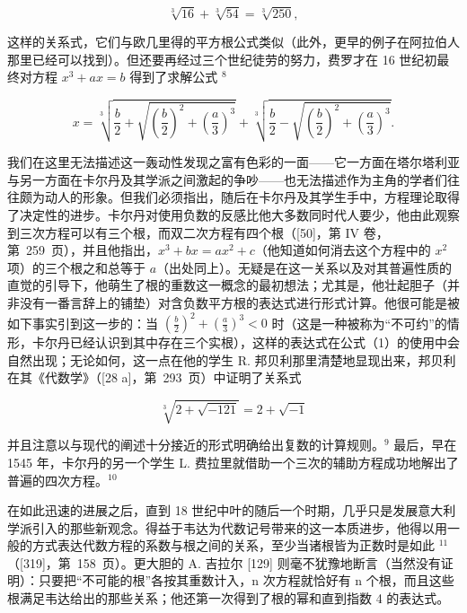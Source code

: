 \[
\sqrt [ 3 ]{16} + \sqrt [ 3 ]{54} = \sqrt [ 3 ]{250},
\]

这样的关系式，它们与欧几里得的平方根公式类似（此外，更早的例子在阿拉伯人那里已经可以找到）。但还要再经过三个世纪徒劳的努力，费罗才在 16 世纪初最终对方程 \(x^{3} + ax = b\) 得到了求解公式 \(^{8}\)

\[
x = \sqrt [ 3 ]{\frac {b}{2} + \sqrt {\left(\frac {b}{2}\right) ^ {2} + \left(\frac {a}{3}\right) ^ {3}}} + \sqrt [ 3 ]{\frac {b}{2} - \sqrt {\left(\frac {b}{2}\right) ^ {2} + \left(\frac {a}{3}\right) ^ {3}}}.\tag{5.1}
\]

我们在这里无法描述这一轰动性发现之富有色彩的一面——它一方面在塔尔塔利亚与另一方面在卡尔丹及其学派之间激起的争吵——也无法描述作为主角的学者们往往颇为动人的形象。但我们必须指出，随后在卡尔丹及其学生手中，方程理论取得了决定性的进步。卡尔丹对使用负数的反感比他大多数同时代人要少，他由此观察到三次方程可以有三个根，而双二次方程有四个根（{[}50{]}，第 IV 卷，第~259~页），并且他指出，\(x^3 + bx = ax^2 + c\)（他知道如何消去这个方程中的 \(x^2\) 项）的三个根之和总等于 \(a\)（出处同上）。无疑是在这一关系以及对其普遍性质的直觉的引导下，他萌生了根的重数这一概念的最初想法；尤其是，他壮起胆子（并非没有一番言辞上的铺垫）对含负数平方根的表达式进行形式计算。他很可能是被如下事实引到这一步的：当 \(\left(\frac{b}{2}\right)^{2}+\left(\frac{a}{3}\right)^{3}<0\) 时（这是一种被称为“不可约”的情形，卡尔丹已经认识到其中存在三个实根），这样的表达式在公式（1）的使用中会自然出现；无论如何，这一点在他的学生 R. 邦贝利那里清楚地显现出来，邦贝利在其《代数学》（{[}28 a{]}，第~293~页）中证明了关系式

\[
\sqrt [ 3 ]{2 + \sqrt {-121}} = 2 + \sqrt {-1}
\]

并且注意以与现代的阐述十分接近的形式明确给出复数的计算规则。\(^{9}\) 最后，早在 1545 年，卡尔丹的另一个学生 L. 费拉里就借助一个三次的辅助方程成功地解出了普遍的四次方程。\(^{10}\)

在如此迅速的进展之后，直到 18 世纪中叶的随后一个时期，几乎只是发展意大利学派引入的那些新观念。得益于韦达为代数记号带来的这一本质进步，他得以用一般的方式表达代数方程的系数与根之间的关系，至少当诸根皆为正数时是如此 \(^{11}\)（{[}319{]}，第~158~页）。更大胆的 A. 吉拉尔 {[}129{]} 则毫不犹豫地断言（当然没有证明）：只要把“不可能的根”各按其重数计入，n 次方程就恰好有 n 个根，而且这些根满足韦达给出的那些关系；他还第一次得到了根的幂和直到指数 4 的表达式。

